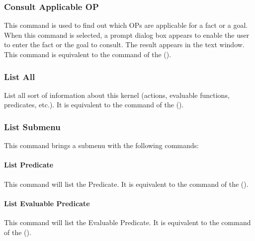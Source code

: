 \subsubsection{Consult Applicable OP}

This command is used to find out which OPs are applicable for a fact or a goal.
When this command is selected, a prompt dialog box appears to enable the user
to enter the fact or the goal to consult. The result appears in the text
window. This command is equivalent to the  command of the \CPK{} ().


\subsubsection{List All}

List all sort of information about this kernel (actions, evaluable functions,
predicates, etc.).  It is equivalent to the
 command of the \CPK{} ().

\subsubsection{List Submenu}


This command brings a submenu with the following commands:

\paragraph{List Predicate}

This command will list the Predicate. It is equivalent to the  command of the \CPK{} ().

\paragraph{List Evaluable Predicate}

This command will list the Evaluable Predicate. It is equivalent to the
 command of the \CPK{} (). 


